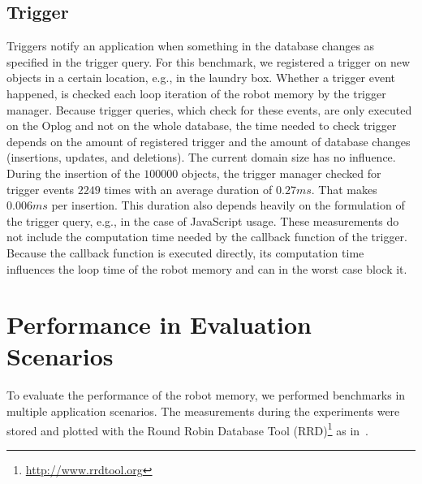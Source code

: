 \subsection{Trigger}
\label{sec:eval-trigger}
Triggers notify an application when something in the database changes
as specified in the trigger query. For this benchmark, we registered a
trigger on new objects in a certain location, e.g., in the laundry
box. Whether a trigger event happened, is checked each loop iteration of
the robot memory by the trigger manager. Because trigger queries,
which check for these events, are only executed on the Oplog and not
on the whole database, the time needed to check trigger depends on the
amount of registered trigger and the amount of database changes
(insertions, updates, and deletions). The current domain size has no
influence. During the insertion of the $100000$ objects, the trigger
manager checked for trigger events $2249$ times with an average
duration of $0.27ms$. That makes $0.006ms$ per insertion. This
duration also depends heavily on the formulation of the trigger query,
e.g., in the case of JavaScript usage. These measurements do not
include the computation time needed by the callback function of the
trigger. Because the callback function is executed directly, its
computation time influences the loop time of the robot memory and can
in the worst case block it.

\section{Performance in Evaluation Scenarios}
\label{sec:performance}
To evaluate the performance of the robot memory, we performed
benchmarks in multiple application scenarios. The measurements during
the experiments were stored and plotted
with the Round Robin Database Tool
(RRD)\footnote{\url{http://www.rrdtool.org}} as in~\cite{RoboDB}.


